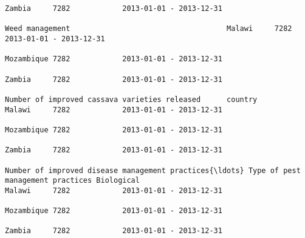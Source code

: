 \documentclass[11pt]{article}
\begin{document}
\begin{Verbatim}[commandchars=\\\{\}]
                                                                                                                                                                                                                 Zambia     7282            2013-01-01 - 2013-12-31   
                                                                                                                                                              Weed management                                    Malawi     7282            2013-01-01 - 2013-12-31   
                                                                                                                                                                                                                 Mozambique 7282            2013-01-01 - 2013-12-31   
                                                                                                                                                                                                                 Zambia     7282            2013-01-01 - 2013-12-31   
                                                                         Number of improved cassava varieties released      country                                                                              Malawi     7282            2013-01-01 - 2013-12-31   
                                                                                                                                                                                                                 Mozambique 7282            2013-01-01 - 2013-12-31   
                                                                                                                                                                                                                 Zambia     7282            2013-01-01 - 2013-12-31   
                                                                         Number of improved disease management practices{\ldots} Type of pest management practices Biological                                         Malawi     7282            2013-01-01 - 2013-12-31   
                                                                                                                                                                                                                 Mozambique 7282            2013-01-01 - 2013-12-31   
                                                                                                                                                                                                                 Zambia     7282            2013-01-01 - 2013-12-31   

\end{Verbatim}
\end{document}

